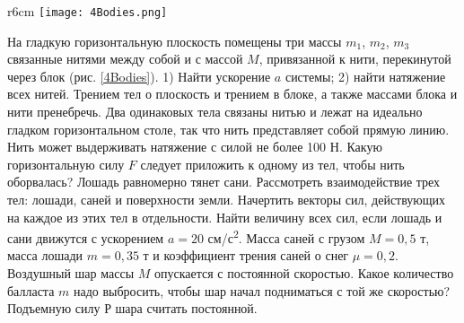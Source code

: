 \begin{wrapfigure}[13]{r}{6cm}
\texttt{[image: 4Bodies.png]}
\caption{}
\label{4Bodies}
\end{wrapfigure}
\AddProb На гладкую горизонтальную плоскость помещены три массы $m_1$, $m_2$, $m_3$ связанные нитями между собой и с массой $M$, привязанной к нити, перекинутой через блок (рис. \ref{4Bodies}). 1) Найти ускорение $a$ системы; 2) найти натяжение всех нитей. Трением тел о плоскость и трением в блоке, а также массами блока и нити пренебречь.
\AddProb Два одинаковых тела связаны нитью и лежат на идеально гладком горизонтальном столе, так что нить представляет собой прямую линию. Нить может выдерживать натяжение с силой не	более 100 Н. Какую горизонтальную силу $F$ следует приложить к одному из тел, чтобы нить оборвалась?
\AddProb Лошадь равномерно тянет сани. Рассмотреть взаимодействие трех тел: лошади, саней и поверхности земли. Начертить векторы сил, действующих на каждое из этих тел в отдельности. Найти величину всех сил, если лошадь и сани движутся с ускорением $a = 20$ см/с\textsuperscript{2}. Масса саней с грузом $M = 0,5$ т, масса лошади $m = 0,35$ т и коэффициент трения саней о снег $\mu = 0,2$.
\AddProb Воздушный шар массы $M$ опускается с постоянной скоростью. Какое количество балласта $m$ надо выбросить, чтобы шар начал подниматься с той же скоростью? Подъемную силу $Р$ шара считать постоянной.

